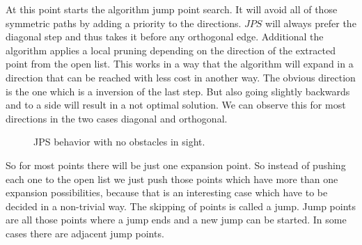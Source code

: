 \documentclass{article}
\begin{document}
    At this point starts the algorithm jump point search. It will avoid all of those symmetric paths by adding a priority to the directions. $JPS$ will always prefer the diagonal step and thus takes it before any orthogonal edge. Additional the algorithm applies a local pruning depending on the direction of the extracted point from the open list. This works in a way that the algorithm will expand in a direction that can be reached with less cost in another way. The obvious direction is the one which is a inversion of the last step. But also going slightly backwards and to a side will result in a not optimal solution. We can observe this for most directions in the two cases diagonal and orthogonal. 
    
    \begin{figure}[!htb]
        \centering
        \hfill
        \caption{JPS behavior with no obstacles in sight. \cite{JPSexplained}}
    \end{figure}
    
    So for most points there will be just one expansion point. So instead of pushing each one to the open list we just push those points which have more than one expansion possibilities, because that is an interesting case which have to be decided in a non-trivial way. The skipping of points is called a jump. Jump points are all those points where a jump ends and a new jump can be started. In some cases there are adjacent jump points.
    
\end{document}
